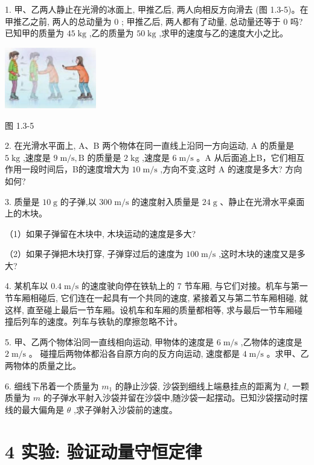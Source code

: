 \documentclass[10pt]{article}
\begin{document}
1. 甲、乙两人静止在光滑的冰面上, 甲推乙后, 两人向相反方向滑去 (图 1.3-5)。在甲推乙之前, 两人的总动量为 0 ; 甲推乙后, 两人都有了动量, 总动量还等于 0 吗? 已知甲的质量为 \({45}\mathrm{\;{kg}}\) ,乙的质量为 \({50}\mathrm{\;{kg}}\) ,求甲的速度与乙的速度大小之比。

\begin{center}
\includegraphics[max width=0.3\textwidth]{images/01910e4c-ebb8-7d2c-8f2f-2375bc1d2d12_21_997035.jpg}
\end{center}

图 1.3-5

2. 在光滑水平面上, A、B 两个物体在同一直线上沿同一方向运动, \(\mathrm{A}\) 的质量是 \(5\mathrm{\;{kg}}\) ,速度是 \(9\mathrm{\;m}/\mathrm{s},\mathrm{B}\) 的质量是 \(2\mathrm{\;{kg}}\) ,速度是 \(6\mathrm{\;m}/\mathrm{s}\) 。A 从后面追上B，它们相互作用一段时间后，B的速度增大为 \({10}\mathrm{\;m}/\mathrm{s}\) ,方向不变,这时 \(\mathrm{A}\) 的速度是多大? 方向如何?

3. 质量是 \({10}\mathrm{\;g}\) 的子弹,以 \({300}\mathrm{\;m}/\mathrm{s}\) 的速度射入质量是 \({24}\mathrm{\;g}\) 、静止在光滑水平桌面上的木块。

（1）如果子弹留在木块中, 木块运动的速度是多大?

（2）如果子弹把木块打穿, 子弹穿过后的速度为 \({100}\mathrm{\;m}/\mathrm{s}\) ,这时木块的速度又是多大?

4. 某机车以 \({0.4}\mathrm{\;m}/\mathrm{s}\) 的速度驶向停在铁轨上的 7 节车厢, 与它们对接。机车与第一节车厢相碰后, 它们连在一起具有一个共同的速度, 紧接着又与第二节车厢相碰, 就这样, 直至碰上最后一节车厢。设机车和车厢的质量都相等, 求与最后一节车厢碰撞后列车的速度。列车与铁轨的摩擦忽略不计。

5. 甲、乙两个物体沿同一直线相向运动, 甲物体的速度是 \(6\mathrm{\;m}/\mathrm{s}\) ,乙物体的速度是 \(2\mathrm{\;m}/\mathrm{s}\) 。 碰撞后两物体都沿各自原方向的反方向运动, 速度都是 \(4\mathrm{\;m}/\mathrm{s}\) 。求甲、乙两物体的质量之比。

6. 细线下吊着一个质量为 \({m}_{1}\) 的静止沙袋, 沙袋到细线上端悬挂点的距离为 \({l}_{ \circ }\) 一颗质量为 \(m\) 的子弹水平射入沙袋并留在沙袋中,随沙袋一起摆动。已知沙袋摆动时摆线的最大偏角是 \(\theta\) ,求子弹射入沙袋前的速度。

\section*{4 实验: 验证动量守恒定律}
\end{document}
